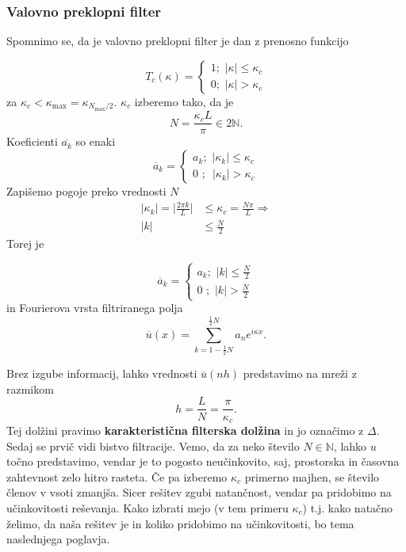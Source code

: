 \documentclass[mat2, tisk]{fmfdelo}
\newcommand{\N}{\mathbb N}
\begin{document}
\subsubsection{Valovno preklopni filter}

Spomnimo se, da je valovno preklopni filter je dan z prenosno funkcijo 

$$
T_c(\kappa)=\begin{cases}
  1 ;\,\, |\kappa| \leq \kappa_c \\
  0 ;\,\, |\kappa| > \kappa_c
\end{cases}
$$
za $\kappa_c < \kappa_\text{max} = \kappa_{N_\text{max}/2}$. $\kappa_c$
izberemo tako, da je 
$$
N = \frac{\kappa_c L}{\pi} \in 2\N.
$$
Koeficienti $\overline{a_k}$ so enaki 
$$
\overline{a}_k=\begin{cases}
  a_k ;\,\, |\kappa_k| \leq \kappa_c \\
  0 \,\,;\,\,\, |\kappa_k| > \kappa_c
\end{cases}
$$
Zapišemo pogoje preko vrednosti $N$
\begin{align*}
|\kappa_k| = \Big| \frac{2\pi k}{L} \Big| &\leq \kappa_c = \frac{N\pi}{L} \Longrightarrow\\[1mm]
|k| &\leq \frac{N}{2}
\end{align*}
Torej je

$$
\overline{a}_k= \begin{cases}a_k ;\,\, |k| \leq \frac{N}{2} \\ 0 \,\,;\,\, |k| > \frac{N}{2}\end{cases}
$$
in Fourierova vrsta filtriranega polja 
\begin{equation}
\overline{u}(x) = \sum_{k = 1 - \frac{1}{2}N}^{\frac{1}{2}N} a_n e^{i\kappa x}.
\end{equation}

Brez izgube informacij, lahko vrednosti $\overline{u}(nh)$ predstavimo na mreži 
z razmikom 
\begin{equation}
h = \frac{L}{N} = \frac{\pi}{\kappa_c}.
\end{equation}
Tej dolžini pravimo \textbf{karakteristična filterska dolžina} in jo 
označimo z $\Delta$. 
\noindent
Sedaj se prvič vidi bistvo filtracije. Vemo, da za neko število 
$N\in \N$, lahko $u$ točno predstavimo, vendar je to pogosto neučinkovito, 
saj, prostorska in časovna zahtevnost zelo hitro rasteta. Če pa izberemo
$\kappa_c$ primerno majhen, se število členov v vsoti zmanjša.
Sicer rešitev zgubi natančnost, vendar pa pridobimo na učinkovitosti reševanja. 
Kako izbrati mejo (v tem primeru $\kappa_c$) t.j. kako natačno želimo, 
da naša rešitev je in koliko pridobimo na učinkovitosti, bo tema naslednjega poglavja.
\end{document}
